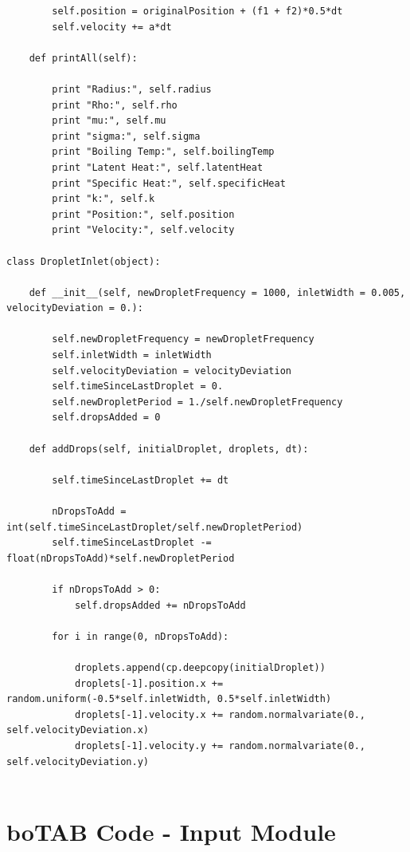 \documentclass[12pt]{article}
\begin{document}
\begin{lstlisting}
        self.position = originalPosition + (f1 + f2)*0.5*dt
        self.velocity += a*dt

    def printAll(self):

        print "Radius:", self.radius
        print "Rho:", self.rho
        print "mu:", self.mu
        print "sigma:", self.sigma
        print "Boiling Temp:", self.boilingTemp
        print "Latent Heat:", self.latentHeat
        print "Specific Heat:", self.specificHeat
        print "k:", self.k
        print "Position:", self.position
        print "Velocity:", self.velocity

class DropletInlet(object):

    def __init__(self, newDropletFrequency = 1000, inletWidth = 0.005, velocityDeviation = 0.):

        self.newDropletFrequency = newDropletFrequency
        self.inletWidth = inletWidth
        self.velocityDeviation = velocityDeviation
        self.timeSinceLastDroplet = 0.
        self.newDropletPeriod = 1./self.newDropletFrequency
        self.dropsAdded = 0

    def addDrops(self, initialDroplet, droplets, dt):

        self.timeSinceLastDroplet += dt

        nDropsToAdd = int(self.timeSinceLastDroplet/self.newDropletPeriod)
        self.timeSinceLastDroplet -= float(nDropsToAdd)*self.newDropletPeriod

        if nDropsToAdd > 0:
            self.dropsAdded += nDropsToAdd

        for i in range(0, nDropsToAdd):

            droplets.append(cp.deepcopy(initialDroplet))
            droplets[-1].position.x += random.uniform(-0.5*self.inletWidth, 0.5*self.inletWidth)
            droplets[-1].velocity.x += random.normalvariate(0., self.velocityDeviation.x)
            droplets[-1].velocity.y += random.normalvariate(0., self.velocityDeviation.y)
            
\end{lstlisting}

\newpage
\section{boTAB Code - Input Module}
\end{document}
